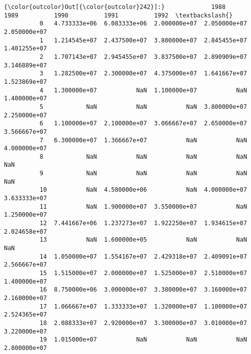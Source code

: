 \documentclass[11pt]{article}
\begin{document}
\begin{Verbatim}[commandchars=\\\{\}]
{\color{outcolor}Out[{\color{outcolor}242}]:}             1988          1989          1990          1991          1992  \textbackslash{}
          0   4.733333e+06  6.083333e+06  2.000000e+07  2.050000e+07  2.050000e+07   
          1   1.214545e+07  2.437500e+07  3.800000e+07  2.845455e+07  1.401255e+07   
          2   1.707143e+07  2.945455e+07  3.837500e+07  2.890909e+07  3.146889e+07   
          3   1.282500e+07  2.300000e+07  4.375000e+07  1.641667e+07  1.523869e+07   
          4   1.300000e+07           NaN  1.100000e+07           NaN  1.400000e+07   
          5            NaN           NaN           NaN  3.800000e+07  2.250000e+07   
          6   1.100000e+07  2.100000e+07  3.066667e+07  2.650000e+07  3.566667e+07   
          7   6.300000e+07  1.366667e+07           NaN           NaN  4.000000e+07   
          8            NaN           NaN           NaN           NaN           NaN   
          9            NaN           NaN           NaN           NaN           NaN   
          10           NaN  4.580000e+06           NaN  4.000000e+07  3.633333e+07   
          11           NaN  1.900000e+07  3.550000e+07           NaN  1.250000e+07   
          12  7.441667e+06  1.237273e+07  1.922250e+07  1.934615e+07  2.024658e+07   
          13           NaN  1.600000e+05           NaN           NaN           NaN   
          14  1.050000e+07  1.554167e+07  2.429318e+07  2.409091e+07  2.566667e+07   
          15  1.515000e+07  2.000000e+07  1.525000e+07  2.510000e+07  1.400000e+07   
          16  8.750000e+06  3.000000e+07  3.380000e+07  3.160000e+07  2.160000e+07   
          17  1.066667e+07  1.333333e+07  1.320000e+07  1.100000e+07  2.524365e+07   
          18  2.088333e+07  2.920000e+07  3.300000e+07  3.010000e+07  3.220000e+07   
          19  1.015000e+07           NaN           NaN           NaN  2.800000e+07   
          

\end{Verbatim}
\end{document}
